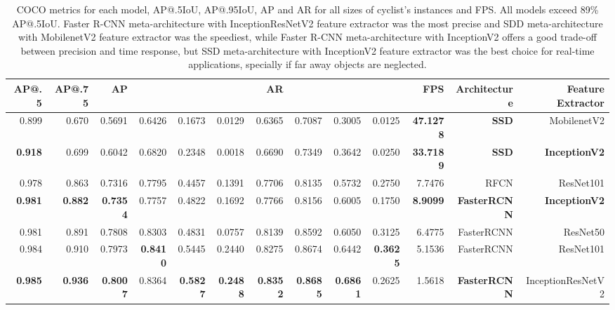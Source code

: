\documentclass[journal]{IEEEtran}
\begin{document}
\begin{table*}[hb!]
\begin{minipage}[c]{0.95\textwidth}
\caption{COCO metrics for each model, AP@.5IoU, AP@.95IoU, AP and AR for all sizes of cyclist's instances and FPS. All models exceed 89\% AP@.5IoU. Faster R-CNN meta-architecture with InceptionResNetV2 feature extractor was the most precise and SDD meta-architecture with MobilenetV2 feature extractor was the speediest, while Faster R-CNN meta-architecture with InceptionV2 offers a good trade-off between precision and time response, but SSD meta-architecture with InceptionV2 feature extractor was the best choice for real-time applications, specially if far away objects are neglected.
\label{table:Cyclist_AP}}
\end{minipage}
\addtolength{\tabcolsep}{-1pt}
\begin{center}
\begin{tabular}{|rrrrrrrrrrrrr|}
\toprule
AP@.5 &  AP@.75 &       AP &       &       &       &  AR&  &     &     & FPS & Architecture &  {Feature Extractor}\\
\midrule
\midrule
0.899 &  0.670 &  0.5691 &  0.6426 &  0.1673 &  0.0129 &  0.6365 &  0.7087 &  0.3005 &  0.0125 &  \textbf{47.1278}&          \textbf{SSD} &        MobilenetV2 \\
\textbf{0.918} &  0.699 &  0.6042 &  0.6820 &  0.2348 &  0.0018 &  0.6690 &  0.7349 &  0.3642 &  0.0250 &  \textbf{33.7189} &          \textbf{SSD} &        \textbf{InceptionV2} \\
0.978 &  0.863 &  0.7316 &  0.7795 &  0.4457 &  0.1391 &  0.7706 &  0.8135 &  0.5732 &  0.2750 &   7.7476 &         RFCN &          ResNet101 \\
\textbf{0.981} &  \textbf{0.882} &  \textbf{0.7354} &  0.7757 &  0.4822&  0.1692 &  0.7766& 0.8156 & 0.6005 &  0.1750&  \textbf{8.9099} &   \textbf{FasterRCNN} &        \textbf{InceptionV2} \\
0.981 &  0.891 &  0.7808 &  0.8303 &  0.4831 &  0.0757 &  0.8139 &  0.8592 &  0.6050 &  0.3125 &  6.4775 &   FasterRCNN &           ResNet50 \\
0.984 &  0.910 &  0.7973 &  \textbf{0.8410} &  0.5445 &  0.2440 &  0.8275 &  0.8674 &  0.6442 &  \textbf{0.3625} &   5.1536 &   FasterRCNN &          ResNet101 \\
\textbf{0.985} &  \textbf{0.936} &  \textbf{0.8007} &  0.8364 &  \textbf{0.5827} &  \textbf{0.2488} &  \textbf{0.8352} &  \textbf{0.8685} &  \textbf{0.6861} &  0.2625 &   1.5618 &   \textbf{FasterRCNN} &  InceptionResNetV2 \\
\bottomrule
\end{tabular}
\end{center}
\end{table*}
\end{document}
